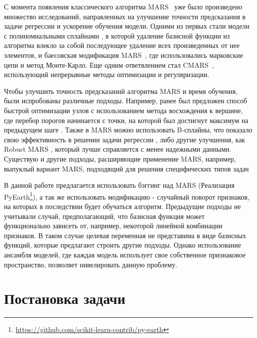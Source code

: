 \documentclass{article}
\newcommand{\cmmnt}[1]{}
\begin{document}
С момента появления классического алгоритма MARS~\cite{friedman1991multivariate} уже было произведено множество исследований, направленных на улучшение точности предсказания в задаче регрессии и ускорение обучения модели. Одними из первых стали модели с полиномиальными сплайнами \cite{stone1997polynomial}, в которой удаление базисной функции из алгоритма влекло за собой последующее удаление всех произведенных от нее элементов, и баесовская модификация MARS~\cite{denison1998bayesian}, где использовались марковские цепи и метод Монте-Карло.
Еще одним ответвлением стал CMARS~\cite{weber2012cmars}, использующий непрерывные методы оптимизации и регуляризации. 

Чтобы улучшить точность предсказаний алгоритма MARS и время обучения, были испробованы различные подходы. Например, ранее был предложен способ быстрой оптимизации узлов с использованием метода восхождения к вершине, где перебор порогов начинается с точки, на которой был достигнут максимум на предыдущем шаге \cmmnt{(Xinglong Ju, Victoria C.P. Chen, 2021)} \cite{ju2021fast}. Также в MARS можно использовать B-сплайны, что показало свою эффективность в решении задачи регрессии \cmmnt{(Sergey Bakin, Markus Hegland \& Michael R. Osborne, 2000)} \cite{bakin2000parallel}, либо другие улучшения, как Robust MARS \cmmnt{(Ozmen \& Weber, 2014)} \cite{ozmen2011rcmars}, который лучше справляется с менее надежными данными. Существую и другие подходы, расширяющие применение MARS, например, выпуклый вариант MARS, подходящий для решения специфических типов задач \cmmnt{(Martinez, Diana L., et al, 2015)}\cite{martinez2015convex}

В данной работе предлагается использовать бэггинг над MARS (Реализация PyEarth\footnote{\url{https://github.com/scikit-learn-contrib/py-earth}}), а так же использовать модификацию - случайный поворот признаков, на которых в последствии будет обучаться алгоритм. Предыдущие подходы не учитывали случай, предполагающий, что базисная функция может функционально зависеть от, например, некоторой линейной комбинации признаков. В таком случае целевая переменная не представима в виде базисных функций, которые предлагают строить другие подходы. Однако использование ансамбля моделей, где каждая модель использует свое собственное признаковое пространство, позволяет нивелировать данную проблему.

\section{Постановка задачи}
\label{sec:headings}
\end{document}

